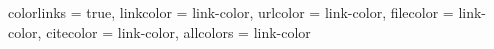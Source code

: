 
\hypersetup
{
  colorlinks  = true,
  linkcolor   = {link-color},
  urlcolor    = {link-color},
  filecolor   = {link-color},
  citecolor   = {link-color},
  allcolors   = {link-color}
}
